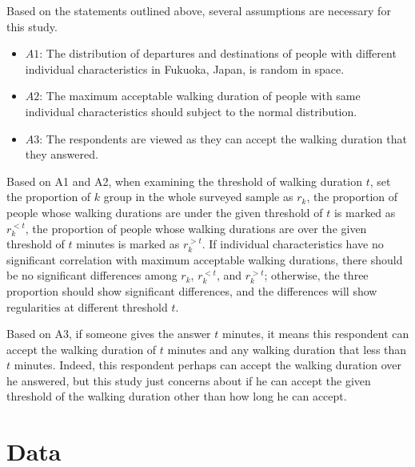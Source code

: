 \documentclass[sustainability,article,submit,moreauthors,pdftex,10pt,a4paper]{Definitions/mdpi}
\begin{document}
%
Based on the statements outlined above, several assumptions are necessary for this study.
\begin{itemize}
	\item $A1$: The distribution of departures and destinations of people with different individual characteristics in Fukuoka, Japan, is random in space. 
	
	\item $A2$: The maximum acceptable walking duration of people with same individual characteristics should subject to the normal distribution. 
	
	\item $A3$: The respondents are viewed as they can accept the walking duration that they answered.
\end{itemize}

%
Based on A1 and A2, when examining the threshold of walking duration $t$, set the proportion of $k$ group in the whole surveyed sample as $r_k$, the proportion of people whose walking durations are under the given threshold of $t$ is marked as $r_{k}^{<t}$, the proportion of people whose walking durations are over the given threshold of $t$ minutes is marked as $r_{k}^{>t}$. If individual characteristics have no significant correlation with maximum acceptable walking durations, there should be no significant differences among $r_k$, $r_{k}^{<t}$, and $r_{k}^{>t}$; otherwise, the three proportion should show significant differences, and the differences will show regularities at different threshold $t$.

%
Based on A3, if someone gives the answer $t$ minutes, it means this respondent can accept the walking duration of $t$ minutes and any walking duration that less than $t$ minutes. Indeed, this respondent perhaps can accept the walking duration over he answered, but this study just concerns about if he can accept the given threshold of the walking duration other than how long he can accept.


%
\section{Data}
%
\end{document}
